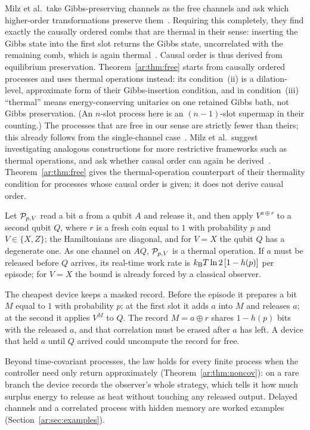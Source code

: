 Milz et al.\ take Gibbs-preserving channels as the free channels and ask which higher-order transformations preserve them~\cite{Milz26}. Requiring this completely, they find exactly the causally ordered combs that are thermal in their sense: inserting the Gibbs state into the first slot returns the Gibbs state, uncorrelated with the remaining comb, which is again thermal~\cite[Def.~8, Thm.~6]{Milz26}. Causal order is thus derived from equilibrium preservation. Theorem~\ref{ar:thm:free} starts from causally ordered processes and uses thermal operations instead: its condition~(ii) is a dilation-level, approximate form of their Gibbs-insertion condition, and in condition~(iii) ``thermal'' means energy-conserving unitaries on one retained Gibbs bath, not Gibbs preservation. (An $n$-slot process here is an $(n-1)$-slot supermap in their counting.) The processes that are free in our sense are strictly fewer than theirs; this already follows from the single-channel case~\cite{FOR15,HaagerupMusat11,DingFengHu21}. Milz et al.\ suggest investigating analogous constructions for more restrictive frameworks such as thermal operations, and ask whether causal order can again be derived~\cite[Sec.~VI]{Milz26}. Theorem~\ref{ar:thm:free} gives the thermal-operation counterpart of their thermality condition for processes whose causal order is given; it does not derive causal order.

\begin{proposition}\label{ar:prop:order}
Let $\mathcal P_{p,V}$ read a bit $a$ from a qubit $A$ and release it, and then apply $V^{a\oplus r}$ to a second qubit $Q$, where $r$ is a fresh coin equal to $1$ with probability $p$ and $V\in\{X,Z\}$; the Hamiltonians are diagonal, and for $V=X$ the qubit $Q$ has a degenerate one. As one channel on $AQ$, $\mathcal P_{p,V}$ is a thermal operation. If $a$ must be released before $Q$ arrives, its real-time work rate is $k_{\mathrm B} T\ln2\,[1-h(p)]$ per episode; for $V=X$ the bound is already forced by a classical observer.
\end{proposition}

The cheapest device keeps a masked record. Before the episode it prepares a bit $M$ equal to $1$ with probability $p$; at the first slot it adds $a$ into $M$ and releases $a$; at the second it applies $V^M$ to $Q$. The record $M=a\oplus r$ shares $1-h(p)$ bits with the released $a$, and that correlation must be erased after $a$ has left. A device that held $a$ until $Q$ arrived could uncompute the record for free.

Beyond time-covariant processes, the law holds for every finite process when the controller need only return approximately (Theorem~\ref{ar:thm:noncov}): on a rare branch the device records the observer's whole strategy, which tells it how much surplus energy to release as heat without touching any released output. Delayed channels and a correlated process with hidden memory are worked examples (Section~\ref{ar:sec:examples}).

